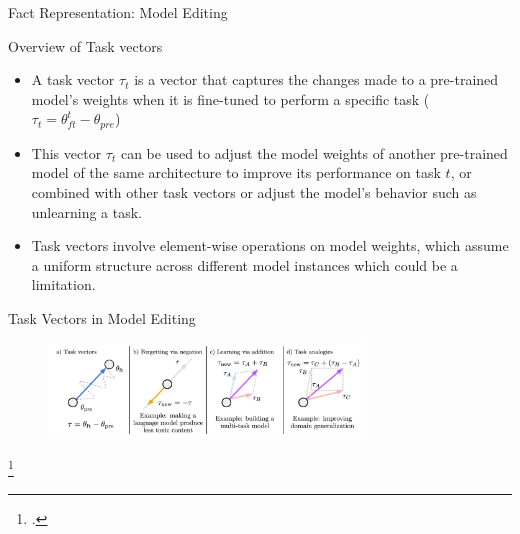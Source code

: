 \documentclass{beamer}
\begin{document}
	\begin{frame}{Fact Representation: Model Editing}
		\begin{block}{\scriptsize Overview of Task vectors}\scriptsize
			\begin{itemize}
				\item A task vector \( \tau_t \) is a vector that captures the changes made to a pre-trained model's weights when it is fine-tuned to perform a specific task ($\tau_t = \theta^t_{ft} - \theta_{pre}$)
				\item This vector \( \tau_t \) can be used to adjust the model weights of another pre-trained model of the same architecture to improve its performance on task \( t \), or combined with other task vectors or adjust the model's behavior such as unlearning a task.
				\item Task vectors involve element-wise operations on model weights, which assume a uniform structure across different model instances which could be a limitation.
			\end{itemize}
		\end{block}
		\begin{block}{\scriptsize Task Vectors in Model Editing\footnotemark}
			\begin{figure}
				\centering
				\includegraphics[width=0.75\textwidth]{task-vector}
			\end{figure}
		\end{block}\footcitetext{ilharco2023editing}
	\end{frame}
	
\end{document}
